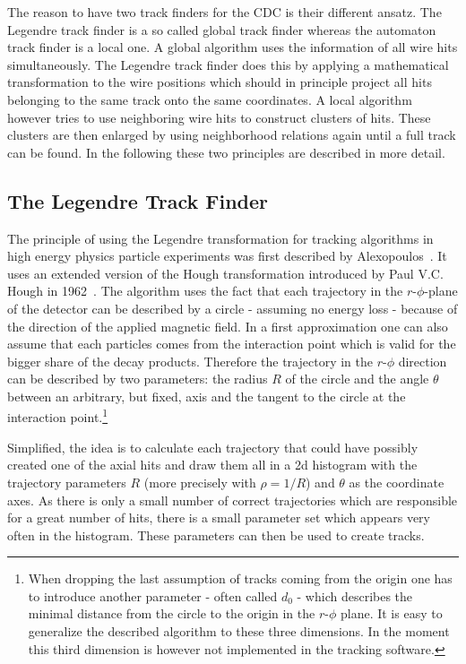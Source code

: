The reason to have two track finders for the CDC is their different ansatz. The Legendre track finder is a so called global track finder whereas the automaton track finder is a local one. A global algorithm uses the information of all wire hits simultaneously. The Legendre track finder does this by applying a mathematical transformation to the wire positions which should in principle project all hits belonging to the same track onto the same coordinates. A local algorithm however tries to use neighboring wire hits to construct clusters of hits. These clusters are then enlarged by using neighborhood relations again until a full track can be found. In the following these two principles are described in more detail.

\subsection{The Legendre Track Finder}
The principle of using the Legendre transformation for tracking algorithms in high energy physics particle experiments was first described by Alexopoulos~\cite{legendre}. It uses an extended version of the Hough transformation introduced by Paul V.C. Hough in 1962~\cite{hough}. The algorithm uses the fact that each trajectory in the $r$-$\phi$-plane of the detector can be described by a circle - assuming no energy loss - because of the direction of the applied magnetic field. In a first approximation one can also assume that each particles comes from the interaction point which is valid for the bigger share of the decay products. Therefore the trajectory in the $r$-$\phi$ direction can be described by two parameters: the radius $R$ of the circle and the angle $\theta$ between an arbitrary, but fixed, axis and the tangent to the circle at the interaction point.\footnote{When dropping the last assumption of tracks coming from the origin one has to introduce another parameter - often called $d_0$ - which describes the minimal distance from the circle to the origin in the $r$-$\phi$ plane. It is easy to generalize the described algorithm to these three dimensions. In the moment this third dimension is however not implemented in the tracking software.}

Simplified, the idea is to calculate each trajectory that could have possibly created one of the axial hits and draw them all in a 2d histogram with the trajectory parameters $R$ (more precisely with $\rho = 1/R$) and $\theta$ as the coordinate axes. As there is only a small number of correct trajectories which are responsible for a great number of hits, there is a small parameter set which appears very often in the histogram. These parameters can then be used to create tracks.

